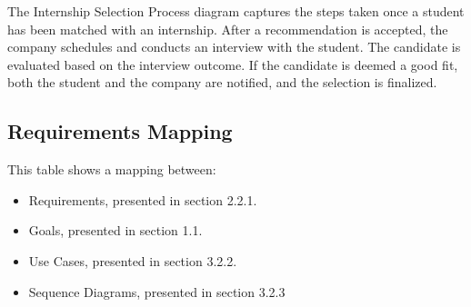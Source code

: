 The Internship Selection Process diagram 
captures the steps taken once a student 
has been matched with an internship. 
After a recommendation is accepted, 
the company schedules and conducts 
an interview with the student. 
The candidate is evaluated 
based on the interview outcome. 
If the candidate is deemed a good fit, 
both the student and the company are notified, 
and the selection is finalized. 


\newpage
\subsection{Requirements Mapping}

This table shows a mapping between:
\hspace*{15mm}
\begin{itemize}
    \item Requirements, presented in section 2.2.1.
    \item Goals, presented in section 1.1.
    \item Use Cases, presented in section 3.2.2.
    \item Sequence Diagrams, presented in section 3.2.3
\end{itemize}
\hspace*{15mm}


